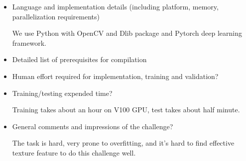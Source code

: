 \documentclass{article}
\begin{document}
\begin{itemize}
\item Language and implementation details (including platform, memory, parallelization requirements)

We use Python with OpenCV and Dlib package and Pytorch deep learning framework.
\item Detailed list of prerequisites for compilation
\item Human effort required for implementation, training and validation?
\item Training/testing expended time?

Training takes about an hour on V100 GPU, test takes about half minute.
\item General comments and impressions of the challenge?

The task is hard, very prone to overfitting, and it's hard to find effective texture feature to do this challenge well.

\end{itemize}
\end{document}
